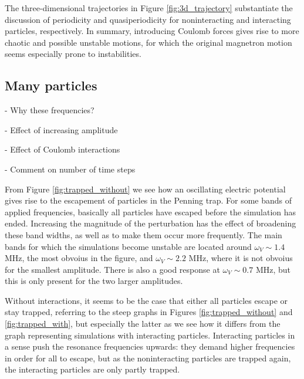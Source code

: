 The three-dimensional trajectories in Figure \ref{fig:3d_trajectory} substantiate the discussion of periodicity and quasiperiodicity for noninteracting and interacting particles, respectively. In summary, introducing Coulomb forces gives rise to more chaotic and possible unstable motions, for which the original magnetron motion seems especially prone to instabilities.





\subsection{Many particles}

\par - Why these frequencies? 
\par - Effect of increasing amplitude
\par - Effect of Coulomb interactions
\par - Comment on number of time steps

From Figure \ref{fig:trapped_without} we see how an oscillating electric potential gives rise to the escapement of particles in the Penning trap. For some bands of applied frequencies, basically all particles have escaped before the simulation has ended. Increasing the magnitude of the perturbation has the effect of broadening these band widths, as well as to make them occur more frequently. The main bands for which the simulations become unstable are located around $\omega_V \sim 1.4$ MHz, the most obvoius in the figure, and $\omega_V \sim 2.2$ MHz, where it is not obvoius for the smallest amplitude. There is also a good response at $\omega_V\sim 0.7$ MHz, but this is only present for the two larger amplitudes.

Without interactions, it seems to be the case that either all particles escape or stay trapped, referring to the steep graphs in Figures \ref{fig:trapped_without} and \ref{fig:trapped_with}, but especially the latter as we see how it differs from the graph representing simulations with interacting particles. Interacting particles in a sense push the resonance frequencies upwards: they demand higher frequencies in order for all to escape, but as the noninteracting particles are trapped again, the interacting particles are only partly trapped. 




